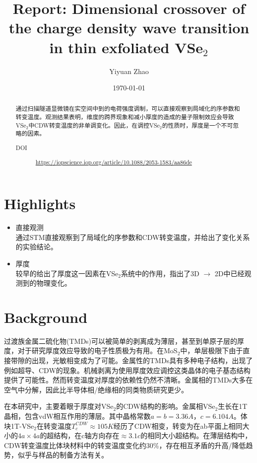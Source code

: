 \documentclass[reprint, aps, prb, showkeys]{revtex4-2}
\begin{document}
\title{Report: Dimensional crossover of the charge density wave transition \\
in thin exfoliated VSe$_2$}

\author{Yiyuan Zhao}
\date{\today}

\begin{abstract}
通过扫描隧道显微镜在实空间中到的电荷强度调制，可以直接观察到局域化的序参数和转变温度。观测结果表明，维度的跨界现象和减小厚度的造成的量子限制效应会导致VSe$_2$中CDW转变温度的非单调变化。因此，在调控VSe$_2$的性质时，厚度是一个不可忽略的因素。
\begin{description}
    \item[DOI] \url{https://iopscience.iop.org/article/10.1088/2053-1583/aa86de}
\end{description}
\end{abstract}


\maketitle
\section{Highlights}
\begin{itemize}
    \item 直接观测 \\
    通过STM直接观察到了局域化的序参数和CDW转变温度，并给出了变化关系的实验结论。
    \item 厚度 \\
    较早的给出了厚度这一因素在VSe$_2$系统中的作用，指出了3D $\to$ 2D中已经观测到的物理变化。
\end{itemize}


\section{Background}
过渡族金属二硫化物(TMDs)可以被简单的剥离成为薄层，甚至到单原子层的厚度，对于研究厚度效应导致的电子性质极为有用。在MoS$_2$中，单层极限下由于直接带隙的出现，光敏相变成为了可能。金属性的TMDs具有多种电子结构，出现了例如超导、CDW的现象。机械剥离为使用厚度效应调控这类晶体的电子基态结构提供了可能性。然而转变温度对厚度的依赖性仍然不清晰。金属相的TMDs大多在空气中分解，因此比半导体相/绝缘相的同类物质研究更少。

在本研究中，主要着眼于厚度对VSe$_2$的CDW结构的影响。金属相VSe$_2$生长在1T晶相，包含vdW相互作用的薄层。其中晶格常数$a = b = 3.36 A$，$c = 6.104 A$。体块1T-VSe$_2$在转变温度$T_c^{CDW} \approx 105 K$经历了CDW相变，转变为在ab平面上相同大小的$4a \times 4a$的超结构，在c轴方向存在$\approx 3.1c$的相同大小超结构。在薄层结构中，CDW转变温度比体块材料中的转变温度变化约30\%，存在相互矛盾的升高/降低趋势，似乎与样品的制备方法有关。
\end{document}
